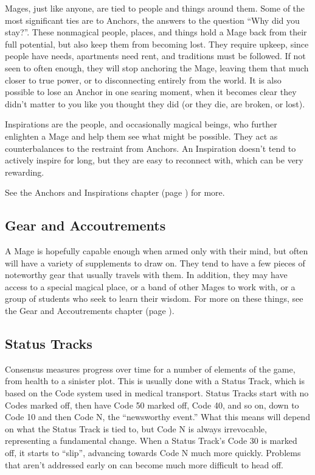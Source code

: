 \documentclass[
]{article}
\begin{document}
Mages, just like anyone, are tied to people and things around them. Some
of the most significant ties are to Anchors, the answers to the question
``Why did you stay?''. These nonmagical people, places, and things hold
a Mage back from their full potential, but also keep them from becoming
lost. They require upkeep, since people have needs, apartments need
rent, and traditions must be followed. If not seen to often enough, they
will stop anchoring the Mage, leaving them that much closer to true
power, or to disconnecting entirely from the world. It is also possible
to lose an Anchor in one searing moment, when it becomes clear they
didn't matter to you like you thought they did (or they die, are broken,
or lost).

Inspirations are the people, and occasionally magical beings, who
further enlighten a Mage and help them see what might be possible. They
act as counterbalances to the restraint from Anchors. An Inspiration
doesn't tend to actively inspire for long, but they are easy to
reconnect with, which can be very rewarding.

See the Anchors and Inspirations chapter (page \pageref{Anchors and Inspirations chapter}) for more.

\hypertarget{gear-and-accoutrements}{%
\subsection{Gear and Accoutrements}\label{gear-and-accoutrements}}

A Mage is hopefully capable enough when armed only with their mind, but often will have a variety of supplements to draw on. They tend to have a few pieces of noteworthy gear that usually travels with them. In addition, they may have access to a special magical place, or a band of other Mages to work with, or a group of students who seek to learn their wisdom. For more on these things, see the Gear and Accoutrements chapter (page \pageref{Gear and Accoutrements chapter}).

\hypertarget{status-tracks}{%
\subsection{Status Tracks}\label{status-tracks}}

Consensus measures progress over time for a number of elements of the
game, from health to a sinister plot. This is usually done with a Status
Track, which is based on the Code system used in medical transport.
Status Tracks start with no Codes marked off, then have Code 50 marked
off, Code 40, and so on, down to Code 10 and then Code N, the
``newsworthy event.'' What this means will depend on what the Status
Track is tied to, but Code N is always irrevocable, representing a
fundamental change. When a Status Track's Code 30 is marked off, it
starts to ``slip'', advancing towards Code N much more quickly. Problems
that aren't addressed early on can become much more difficult to head
off.
\end{document}
